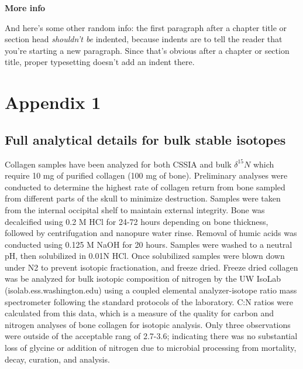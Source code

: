\documentclass [11pt, proquest] {uwthesis}[2015/03/03]
\begin{document}
\textbf{More info}

And here's some other random info: the first paragraph after a chapter
title or section head \emph{shouldn't be} indented, because indents are
to tell the reader that you're starting a new paragraph. Since that's
obvious after a chapter or section title, proper typesetting doesn't add
an indent there.

\appendix

\chapter{Appendix 1}\label{appendix-1}

\section{Full analytical details for bulk stable
isotopes}\label{full-analytical-details-for-bulk-stable-isotopes}

Collagen samples have been analyzed for both CSSIA and bulk
\(\delta^{15}N\) which require 10 mg of purified collagen (100 mg of
bone). Preliminary analyses were conducted to determine the highest rate
of collagen return from bone sampled from different parts of the skull
to minimize destruction. Samples were taken from the internal occipital
shelf to maintain external integrity. Bone was decalcified using 0.2 M
HCl for 24-72 hours depending on bone thickness, followed by
centrifugation and nanopure water rinse. Removal of humic acids was
conducted using 0.125 M NaOH for 20 hours. Samples were washed to a
neutral pH, then solubilized in 0.01N HCl. Once solubilized samples were
blown down under N2 to prevent isotopic fractionation, and freeze dried.
Freeze dried collagen was be analyzed for bulk isotopic composition of
nitrogen by the UW IsoLab (isolab.ess.washington.edu) using a coupled
elemental analyzer-isotope ratio mass spectrometer following the
standard protocols of the laboratory. C:N ratios were calculated from
this data, which is a measure of the quality for carbon and nitrogen
analyses of bone collagen for isotopic analysis. Only three observations
were outside of the acceptable rang of 2.7-3.6; indicating there was no
substantial loss of glycine or addition of nitrogen due to microbial
processing from mortality, decay, curation, and analysis.
\end{document}

